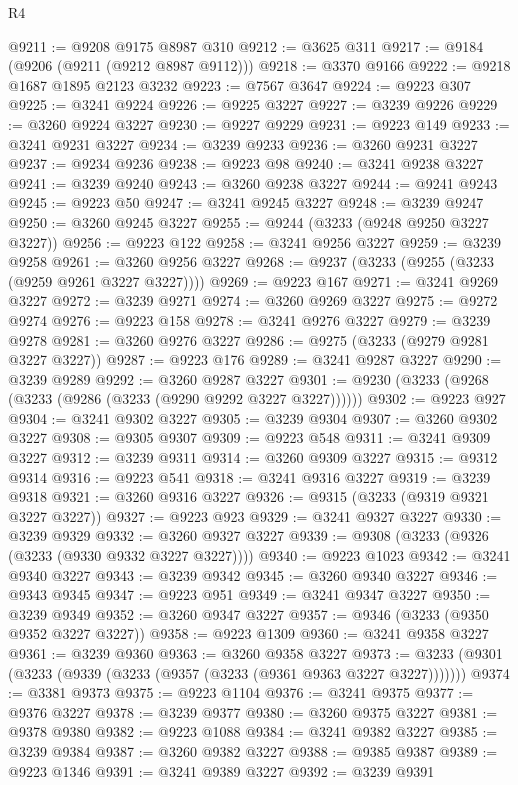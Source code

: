 \begin{lexlean}{R4}
\begin{coremodule}
@9211 := @9208 @9175 @8987 @310
@9212 := @3625 @311
@9217 := @9184 (@9206 (@9211 (@9212 @8987 @9112)))
@9218 := @3370 @9166
@9222 := @9218 @1687 @1895 @2123 @3232
@9223 := @7567 @3647
@9224 := @9223 @307
@9225 := @3241 @9224
@9226 := @9225 @3227
@9227 := @3239 @9226
@9229 := @3260 @9224 @3227
@9230 := @9227 @9229
@9231 := @9223 @149
@9233 := @3241 @9231 @3227
@9234 := @3239 @9233
@9236 := @3260 @9231 @3227
@9237 := @9234 @9236
@9238 := @9223 @98
@9240 := @3241 @9238 @3227
@9241 := @3239 @9240
@9243 := @3260 @9238 @3227
@9244 := @9241 @9243
@9245 := @9223 @50
@9247 := @3241 @9245 @3227
@9248 := @3239 @9247
@9250 := @3260 @9245 @3227
@9255 := @9244 (@3233 (@9248 @9250 @3227 @3227))
@9256 := @9223 @122
@9258 := @3241 @9256 @3227
@9259 := @3239 @9258
@9261 := @3260 @9256 @3227
@9268 := @9237 (@3233 (@9255 (@3233 (@9259 @9261 @3227 @3227))))
@9269 := @9223 @167
@9271 := @3241 @9269 @3227
@9272 := @3239 @9271
@9274 := @3260 @9269 @3227
@9275 := @9272 @9274
@9276 := @9223 @158
@9278 := @3241 @9276 @3227
@9279 := @3239 @9278
@9281 := @3260 @9276 @3227
@9286 := @9275 (@3233 (@9279 @9281 @3227 @3227))
@9287 := @9223 @176
@9289 := @3241 @9287 @3227
@9290 := @3239 @9289
@9292 := @3260 @9287 @3227
@9301 := @9230 (@3233 (@9268 (@3233 (@9286 (@3233 (@9290 @9292 @3227 @3227))))))
@9302 := @9223 @927
@9304 := @3241 @9302 @3227
@9305 := @3239 @9304
@9307 := @3260 @9302 @3227
@9308 := @9305 @9307
@9309 := @9223 @548
@9311 := @3241 @9309 @3227
@9312 := @3239 @9311
@9314 := @3260 @9309 @3227
@9315 := @9312 @9314
@9316 := @9223 @541
@9318 := @3241 @9316 @3227
@9319 := @3239 @9318
@9321 := @3260 @9316 @3227
@9326 := @9315 (@3233 (@9319 @9321 @3227 @3227))
@9327 := @9223 @923
@9329 := @3241 @9327 @3227
@9330 := @3239 @9329
@9332 := @3260 @9327 @3227
@9339 := @9308 (@3233 (@9326 (@3233 (@9330 @9332 @3227 @3227))))
@9340 := @9223 @1023
@9342 := @3241 @9340 @3227
@9343 := @3239 @9342
@9345 := @3260 @9340 @3227
@9346 := @9343 @9345
@9347 := @9223 @951
@9349 := @3241 @9347 @3227
@9350 := @3239 @9349
@9352 := @3260 @9347 @3227
@9357 := @9346 (@3233 (@9350 @9352 @3227 @3227))
@9358 := @9223 @1309
@9360 := @3241 @9358 @3227
@9361 := @3239 @9360
@9363 := @3260 @9358 @3227
@9373 := @3233 (@9301 (@3233 (@9339 (@3233 (@9357 (@3233 (@9361 @9363 @3227 @3227)))))))
@9374 := @3381 @9373
@9375 := @9223 @1104
@9376 := @3241 @9375
@9377 := @9376 @3227
@9378 := @3239 @9377
@9380 := @3260 @9375 @3227
@9381 := @9378 @9380
@9382 := @9223 @1088
@9384 := @3241 @9382 @3227
@9385 := @3239 @9384
@9387 := @3260 @9382 @3227
@9388 := @9385 @9387
@9389 := @9223 @1346
@9391 := @3241 @9389 @3227
@9392 := @3239 @9391

\end{coremodule}
\end{lexlean}
